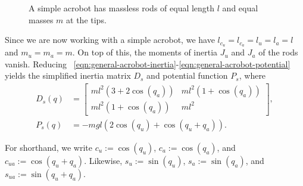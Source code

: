\begin{figure}
    \centering
    
    \caption{A simple acrobot has massless rods of equal length \(l\) and 
    equal masses \(m\) at the tips.}
    \label{fig:simple-acrobot-model}
\end{figure}

Since we are now working with a simple acrobot, 
we have \(l_{c_u} = l_{c_a} = l_u = l_a = l\) and
\(m_u = m_a = m\). 
On top of this, the moments of inertia \(J_u\) and \(J_a\) of the rods vanish.
Reducing
~\eqref{eqn:general-acrobot-inertia}-\ref{eqn:general-acrobot-potential}
yields the simplified inertia matrix \(D_s\) and potential function \(P_s\),
where
\begin{align}
    D_s(q) &= \begin{bmatrix}
        ml^2\left(3+2\cos(q_a)\right) & 
        ml^2\left(1+\cos(q_a)\right) \\
        ml^2\left(1+\cos(q_a)\right) &
        ml^2
    \end{bmatrix} 
    , \\
    P_s(q) &= -mgl\left(2\cos(q_u)+\cos(q_u+q_a)\right)
    .
\end{align}
\begin{notation}
    For shorthand, we write \(c_u := \cos(q_u)\), \(c_a := \cos(q_a)\), and 
    \(c_{ua} := \cos(q_u + q_a)\). Likewise, \(s_u := \sin(q_u)\), 
    \(s_a := \sin(q_a)\), and \(s_{ua} := \sin(q_u + q_a)\).
\end{notation}

